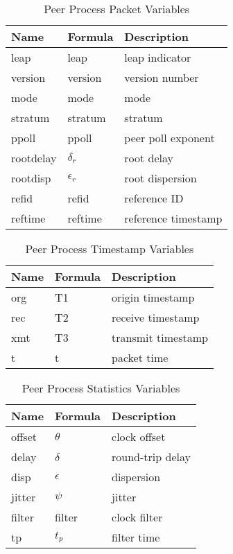 \begin{table}[htb]
\center
\begin{tabular}{| l | l | l |}
\hline
Name & Formula & Description \\
\hline
\hline
leap & leap & leap indicator \\
version & version & version number \\
mode & mode & mode \\
stratum & stratum & stratum \\
ppoll & ppoll & peer poll exponent \\
rootdelay & $ \delta_r $ & root delay \\
rootdisp & $ \epsilon_r $ & root dispersion \\
refid & refid & reference ID \\
reftime & reftime & reference timestamp \\
\hline
\end{tabular}
\caption{Peer Process Packet Variables}
\label{peer_process_packet_variables}
\end{table}

\begin{table}[htb]
\center
\begin{tabular}{| l | l | l |}
\hline
Name & Formula & Description \\
\hline
\hline
org & T1 & origin timestamp \\
rec & T2 & receive timestamp \\
xmt & T3 & transmit timestamp \\
t & t & packet time \\
\hline
\end{tabular}
\caption{Peer Process Timestamp Variables}
\label{peer_process_timestamp_variables}
\end{table}

\begin{table}[htb]
\center
\begin{tabular}{| l | l | l |}
\hline
Name & Formula & Description \\
\hline
\hline
offset & $ \theta $ & clock offset \\
delay & $ \delta $ & round-trip delay\\
disp & $ \epsilon $ & dispersion \\
jitter & $ \psi $ & jitter \\
filter & filter & clock filter \\
tp & $ t_p $ & filter time \\
\hline
\end{tabular}
\caption{Peer Process Statistics Variables}
\label{peer_process_statistics_variables}
\end{table}

